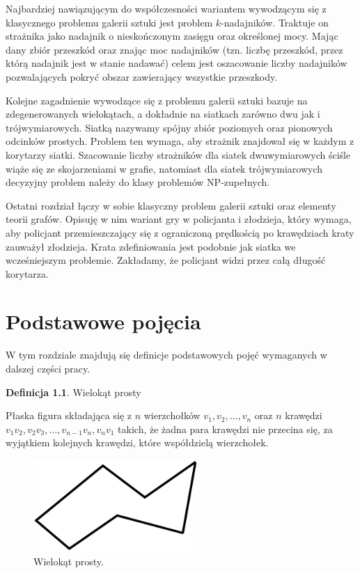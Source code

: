 \documentclass{xmgr}
\theoremstyle{definition}
\newtheorem{Definicja}{Definicja}
\begin{document}
Najbardziej nawiązującym do współczesności wariantem wywodzącym się z klasycznego problemu galerii sztuki jest problem $k$-nadajników. Traktuje on strażnika jako nadajnik o nieskończonym zasięgu oraz określonej mocy. Mając dany zbiór przeszkód oraz znając moc nadajników (tzn. liczbę przeszkód, przez którą nadajnik jest w stanie nadawać) celem jest oszacowanie liczby nadajników pozwalających pokryć obszar zawierający wszystkie przeszkody.

Kolejne zagadnienie wywodzące się z problemu galerii sztuki bazuje na zdegenerowanych wielokątach, a dokładnie na siatkach zarówno dwu jak i trójwymiarowych. Siatką nazywamy spójny zbiór poziomych oraz pionowych odcinków prostych. Problem ten wymaga, aby strażnik znajdował się w każdym z korytarzy siatki. Szacowanie liczby strażników dla siatek dwuwymiarowych ściśle wiąże się ze skojarzeniami w grafie, natomiast dla siatek trójwymiarowych decyzyjny problem należy do klasy problemów NP-zupełnych.

Ostatni rozdział łączy w sobie klasyczny problem galerii sztuki oraz elementy teorii grafów. Opisuję w nim wariant gry w policjanta i złodzieja, który wymaga, aby policjant przemieszczający się z ograniczoną prędkością po krawędziach kraty zauważył złodzieja. Krata zdefiniowania jest podobnie jak siatka we wcześniejszym problemie. Zakładamy, że policjant widzi przez całą długość korytarza.


\chapter{Podstawowe pojęcia}
W tym rozdziale znajdują się definicje podstawowych pojęć wymaganych w dalszej części pracy.

\begin{Definicja}{Wielokąt prosty}

  Płaska figura składająca się z $n$ wierzchołków $v_1, v_2,\ldots, v_n$ oraz $n$ krawędzi $v_1v_2, v_2v_3, \ldots, v_{n-1}v_n,v_nv_1$ takich, że żadna para krawędzi nie przecina się, za wyjątkiem kolejnych krawędzi, które współdzielą wierzchołek.
\end{Definicja}

\begin{figure}[ht!]
  \centering
  \includegraphics[height=3.5cm]{rysunki/wielokat_prosty.png}
    \caption{Wielokąt prosty.}
\end{figure} 
\end{document}
